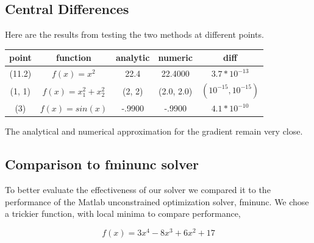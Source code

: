 \documentclass[10pt,twocolumn]{article}
\begin{document}
\subsection*{ Central Differences}
Here are the results from testing the two methods at different points.

\begin{center}
  \begin{tabular}{ | c | c | c | c | c | }
    \hline
     point & function & analytic & numeric & diff \\ \hline
     (11.2) & $f(x) = x^2$ & 22.4 & 22.4000 & $3.7*10^{-13}$ \\ \hline
     (1, 1) & $f(x) = x_1^2+ x_2^2$ & (2, 2) & (2.0, 2.0) & $(10^{-15}, 10^{-15})$ \\ \hline
     (3) & $f(x) = sin(x)$ & -.9900 & -.9900 & $4.1*10^{-10}$ \\ 
    \hline
  \end{tabular}
\end{center}

The analytical and numerical approximation for the gradient remain very close.

\subsection*{Comparison to fminunc solver}

To better evaluate the effectiveness of our solver we compared it to the performance of the Matlab unconstrained optimization solver, fminunc. We chose a trickier function, with local minima to compare performance, 

\begin{equation}
f(x)= 3x^4-8x^3+6x^2+17
\end{equation}
\end{document}
